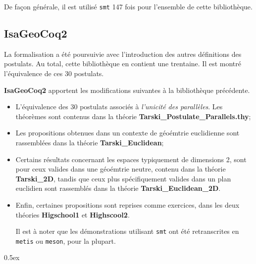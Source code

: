 \documentclass[8pt,a4paper]{article}
\theoremstyle{plain}
\begin{document}
 De façon générale, il est utilisé \verb+smt+ 147 fois pour l'ensemble de cette bibliothèque.


\subsection{\textbf{IsaGeoCoq2}}


La formalisation a été poursuivie avec l'introduction des autres définitions des postulats.
Au total, cette bibliothèque en contient une trentaine.
Il est montré l'équivalence de ces 30 postulats.


\textbf{IsaGeoCoq2} apportent les modifications suivantes à la bibliothèque précédente.
\begin{itemize}
\item L'équivalence des 30 postulats associés à \textit{l'unicité des parallèles}.
  Les théorèmes sont contenus dans la théorie \textbf{Tarski\_Postulate\_Parallels.thy};
\item Les propositions obtenues dans un contexte de géoémtrie euclidienne sont rassemblées dans la théorie \textbf{Tarski\_Euclidean};
\item Certains résultats concernant les espaces typiquement de dimensions 2, sont pour ceux valides dans une géoémtrie neutre, contenu dans la théorie \textbf{Tarski\_2D},
  tandis que ceux plus spécifiquement valides dans un plan euclidien sont rassemblés dans la théorie \textbf{Tarski\_Euclidean\_2D}.
\item Enfin, certaines propositions sont reprises comme exercices, dans les deux théories \textbf{Higschool1} et \textbf{Highscool2}.

  Il est à noter que les démonstrations utilisant \verb+smt+ ont été retranscrites en \verb+metis+ ou \verb+meson+, pour la plupart.
  \end{itemize}




\parindent 0pt\parskip 0.5ex

\clearpage


\clearpage


\end{document}
